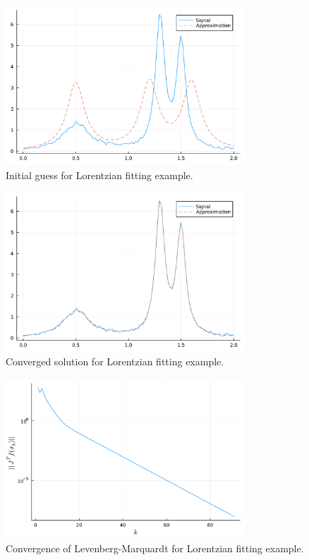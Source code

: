 \documentclass[12pt, leqno]{article} %
\begin{document}
\begin{figure}
\begin{center}
  \includegraphics[width=0.8\textwidth]{fig/2023-04-10-lorx_guess.pdf}
\end{center}
\caption{Initial guess for Lorentzian fitting example.}
\label{fig:lorx-guess}
\end{figure}

\begin{figure}
\begin{center}
  \includegraphics[width=0.8\textwidth]{fig/2023-04-10-lorx_lm.pdf}
\end{center}
\caption{Converged solution for Lorentzian fitting example.}
\label{fig:lorx-lm}
\end{figure}

\begin{figure}
\begin{center}
  \includegraphics[width=0.8\textwidth]{fig/2023-04-10-lorx_lm_cvg.pdf}
\end{center}
\caption{Convergence of Levenberg-Marquardt for Lorentzian fitting example.}
\label{fig:lorx-lm-cvg}
\end{figure}
\end{document}
